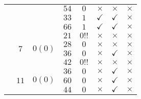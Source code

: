 \documentclass[12pt,a4paper,halfparskip,headsepline,bibtotocnumbered]{scrreprt}
\theoremstyle{nummermitklammern}
\theoremstyle{nonumberbreak}
\begin{document}
\begin{table}[H]
\begin{tabular}{|c|c|c|c|c|c|c|c|}
								&						&							&$54$	&$0$	&$\times$		&$\times$		&$\times$\\ \cline{4-8}
								&						&							&$33$	&$1$	&$\checkmark$	&$\checkmark$	&$\times$\\ \cline{4-8}
								&						&							&$66$	&$1$	&$\checkmark$	&$\checkmark$	&$\times$\\ \cline{2-8}
								&\multirow{4}{*}{$7$}	&\multirow{4}{*}{$0(0)$}	&$21$	&$0!!$	&$\times$		&$\times$		&$\times$\\ \cline{4-8}
								&						&							&$28$	&$0$	&$\times$		&$\times$		&$\times$\\ \cline{4-8}
								&						&							&$36$	&$0$	&$\times$		&$\checkmark$	&$\times$\\ \cline{4-8}
								&						&							&$42$	&$0!!$	&$\times$		&$\times$		&$\times$\\ \cline{2-8}
								&\multirow{3}{*}{$11$}&\multirow{3}{*}{$0(0)$}		&$36$	&$0$	&$\times$		&$\checkmark$	&$\times$\\ \cline{4-8}
								&						&							&$60$	&$0$	&$\times$		&$\checkmark$	&$\times$\\ \cline{4-8}
								&						&							&$44$	&$0$	&$\times$		&$\checkmark$	&$\times$\\ \hline
	\end{tabular}
\end{table}
\end{document}
